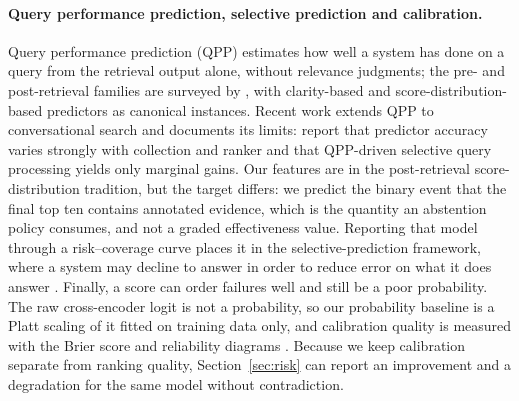 \documentclass[11pt,a4paper]{article}
\begin{document}
\paragraph{Query performance prediction, selective prediction and calibration.}
Query performance prediction (QPP) estimates how well a system has done on a query from the
retrieval output alone, without relevance judgments; the pre- and post-retrieval families are
surveyed by \citet{carmel2010querydifficulty}, with clarity-based
\citep{cronentownsend2002clarity} and score-distribution-based \citep{shtok2012querydrift}
predictors as canonical instances. Recent work extends QPP to conversational search
\citep{meng2023qpp} and documents its limits: \citet{chifu2025qpplimits} report that predictor
accuracy varies strongly with collection and ranker and that QPP-driven selective query
processing yields only marginal gains. Our features are in the post-retrieval
score-distribution tradition, but the target differs: we predict the binary event that the final
top ten contains annotated evidence, which is the quantity an abstention policy consumes, and
not a graded effectiveness value. Reporting that model through a risk--coverage curve
places it in the selective-prediction framework, where a system may decline to answer in order
to reduce error on what it does answer \citep{elyaniv2010selective,geifman2017selective}.
Finally, a score can order failures well and still be a poor probability. The raw cross-encoder
logit is not a probability, so our probability baseline is a Platt scaling of it
\citep{platt1999probabilistic} fitted on training data only, and calibration quality is measured
with the Brier score \citep{brier1950verification} and reliability diagrams
\citep{niculescu2005goodprobabilities,guo2017calibration}. Because we keep calibration separate
from ranking quality, Section~\ref{sec:risk} can report an improvement and a degradation for the
same model without contradiction.
\end{document}
